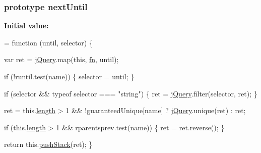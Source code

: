 \subsubsection[{\texorpdfstring{next\+Until}{nextUntil}}]{ {\bf prototype} next\+Until}\hypertarget{jquery-2_82_81-vsdoc_8js_af68b07d83c395633085335fd87872672}{}\label{jquery-2_82_81-vsdoc_8js_af68b07d83c395633085335fd87872672}
{\bfseries Initial value\+:}
\begin{DoxyCode}
= \textcolor{keyword}{function} (until, selector) \{
        

        var ret = \hyperlink{jquery-2_82_81-vsdoc_8js_add5237586d970a38a81f990e8eb28c6c}{jQuery}.map(\textcolor{keyword}{this}, \hyperlink{jquery-2_82_81-vsdoc_8js_acef6bdaf6b9b20fdcca1ea86f0902c3b}{fn}, until);

        \textcolor{keywordflow}{if} (!runtil.test(name)) \{
            selector = until;
        \}

        \textcolor{keywordflow}{if} (selector && typeof selector === \textcolor{stringliteral}{"string"}) \{
            ret = \hyperlink{jquery-2_82_81-vsdoc_8js_add5237586d970a38a81f990e8eb28c6c}{jQuery}.filter(selector, ret);
        \}

        ret = this.\hyperlink{jquery-2_82_81-vsdoc_8js_aa7de35d58da66d9944ab9cbe82c19640}{length} > 1 && !guaranteedUnique[name] ? \hyperlink{jquery-2_82_81-vsdoc_8js_add5237586d970a38a81f990e8eb28c6c}{jQuery}.unique(ret) : ret;

        \textcolor{keywordflow}{if} (this.\hyperlink{jquery-2_82_81-vsdoc_8js_aa7de35d58da66d9944ab9cbe82c19640}{length} > 1 && rparentsprev.test(name)) \{
            ret = ret.reverse();
        \}

        \textcolor{keywordflow}{return} this.\hyperlink{jquery-2_82_81-vsdoc_8js_afc3a7db1ef2b526338c06c07cecccd44}{pushStack}(ret);
    \}
\end{DoxyCode}
